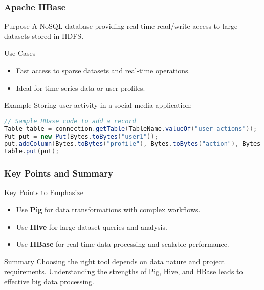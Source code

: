 \documentclass[aspectratio=169]{beamer}
\begin{document}
\begin{frame}[fragile]
    \frametitle{Apache HBase}
    \begin{block}{Purpose}
        A NoSQL database providing real-time read/write access to large datasets stored in HDFS.
    \end{block}
    \begin{block}{Use Cases}
        \begin{itemize}
            \item Fast access to sparse datasets and real-time operations.
            \item Ideal for time-series data or user profiles.
        \end{itemize}
    \end{block}
    \begin{block}{Example}
        Storing user activity in a social media application:
        \begin{lstlisting}[language=Java, style=custom]
// Sample HBase code to add a record
Table table = connection.getTable(TableName.valueOf("user_actions"));
Put put = new Put(Bytes.toBytes("user1"));
put.addColumn(Bytes.toBytes("profile"), Bytes.toBytes("action"), Bytes.toBytes("login"));
table.put(put);
        \end{lstlisting}
    \end{block}
\end{frame}

\begin{frame}
    \frametitle{Key Points and Summary}
    \begin{block}{Key Points to Emphasize}
        \begin{itemize}
            \item Use \textbf{Pig} for data transformations with complex workflows.
            \item Use \textbf{Hive} for large dataset queries and analysis.
            \item Use \textbf{HBase} for real-time data processing and scalable performance.
        \end{itemize}
    \end{block}
    \begin{block}{Summary}
        Choosing the right tool depends on data nature and project requirements. Understanding the strengths of Pig, Hive, and HBase leads to effective big data processing.
    \end{block}
\end{frame}
\end{document}
